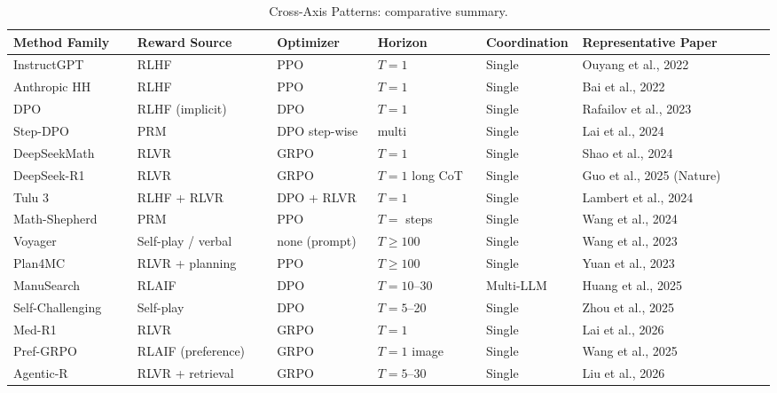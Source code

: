 \documentclass{article}
\begin{document}
\begin{table}[t]
\centering
\caption{Cross-Axis Patterns: comparative summary.}
\label{tab:cross-axis-patterns}
\begin{tabular}{>{\raggedright\arraybackslash}p{0.1633\linewidth}
  >{\raggedright\arraybackslash}p{0.1837\linewidth}
  >{\raggedright\arraybackslash}p{0.1327\linewidth}
  >{\raggedright\arraybackslash}p{0.1429\linewidth}
  >{\raggedright\arraybackslash}p{0.1224\linewidth}
  >{\raggedright\arraybackslash}p{0.2551\linewidth}}
\toprule
Method Family & Reward Source & Optimizer & Horizon & Coordination & Representative Paper \\
\midrule
InstructGPT & RLHF & PPO & \(T=1\) & Single & Ouyang et al., 2022 \\
Anthropic HH & RLHF & PPO & \(T=1\) & Single & Bai et al., 2022 \\
DPO & RLHF (implicit) & DPO & \(T=1\) & Single & Rafailov et al., 2023 \\
Step-DPO & PRM & DPO step-wise & multi & Single & Lai et al., 2024 \\
DeepSeekMath & RLVR & GRPO & \(T=1\) & Single & Shao et al., 2024 \\
DeepSeek-R1 & RLVR & GRPO & \(T=1\) long CoT & Single & Guo et al., 2025 (Nature) \\
Tulu 3 & RLHF + RLVR & DPO + RLVR & \(T=1\) & Single & Lambert et al., 2024 \\
Math-Shepherd & PRM & PPO & \(T=\) steps & Single & Wang et al., 2024 \\
Voyager & Self-play / verbal & none (prompt) & \(T \ge 100\) & Single & Wang et al., 2023 \\
Plan4MC & RLVR + planning & PPO & \(T \ge 100\) & Single & Yuan et al., 2023 \\
ManuSearch & RLAIF & DPO & \(T=10\)--30 & Multi-LLM & Huang et al., 2025 \\
Self-Challenging & Self-play & DPO & \(T=5\)--20 & Single & Zhou et al., 2025 \\
Med-R1 & RLVR & GRPO & \(T=1\) & Single & Lai et al., 2026 \\
Pref-GRPO & RLAIF (preference) & GRPO & \(T=1\) image & Single & Wang et al., 2025 \\
Agentic-R & RLVR + retrieval & GRPO & \(T=5\)--30 & Single & Liu et al., 2026 \\
\end{tabular}
\end{table}
\end{document}
